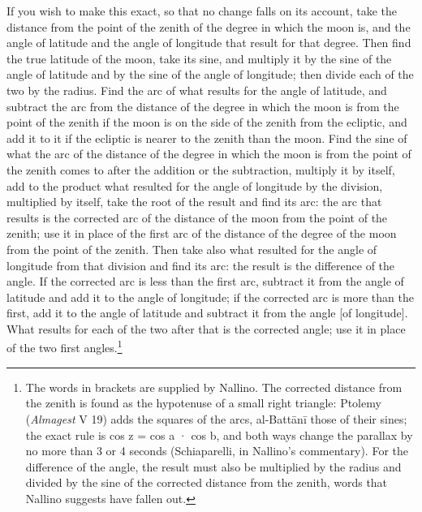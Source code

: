 \documentclass[11pt]{article}
\newcommand{\ArPage}[1]{\marginpar{\footnotesize\color{gray}Ar.\,p.\,#1}}
\begin{document}
\par \ArPage{124}If you wish to make this exact, so that no change falls on its account, take the distance from the point of the zenith of the degree in which the moon is, and the angle of latitude and the angle of longitude that result for that degree. Then find the true latitude of the moon, take its sine, and multiply it by the sine of the angle of latitude and by the sine of the angle of longitude; then divide each of the two by the radius. Find the arc of what results for the angle of latitude, and subtract the arc from the distance of the degree in which the moon is from the point of the zenith if the moon is on the side of the zenith from the ecliptic, and add it to it if the ecliptic is nearer to the zenith than the moon. Find the sine of what the arc of the distance of the degree in which the moon is from the point of the zenith comes to after the addition or the subtraction, multiply it by itself, add to the product what resulted for the angle of longitude by the division, multiplied by itself, take the root of the result and find its arc: the arc that results is the corrected arc of the distance of the moon from the point of the zenith; use it in place of the first arc of the distance of the degree of the moon from the point of the zenith. Then take also what resulted for the angle of longitude from that division and find its arc: the result is the difference of the angle. If the corrected arc is less than the first arc, subtract it from the angle of latitude and add it to the angle of longitude; if the corrected arc is more than the first, add it to the angle of latitude and subtract it from the angle [of longitude]. What results for each of the two after that is the corrected angle; use it in place of the two first angles.\footnote{The words in brackets are supplied by Nallino. The corrected distance from the zenith is found as the hypotenuse of a small right triangle: Ptolemy (\emph{Almagest} V 19) adds the squares of the arcs, al-Battānī those of their sines; the exact rule is cos z = cos a · cos b, and both ways change the parallax by no more than 3 or 4 seconds (Schiaparelli, in Nallino's commentary). For the difference of the angle, the result must also be multiplied by the radius and divided by the sine of the corrected distance from the zenith, words that Nallino suggests have fallen out.}\par
\end{document}
